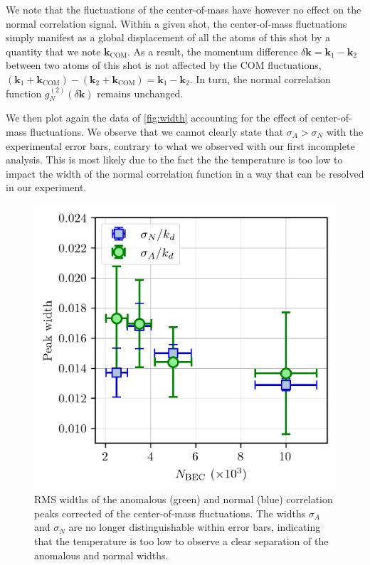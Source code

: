 We note that the fluctuations of the center-of-mass have however no effect on the normal correlation signal. Within a given shot, the center-of-mass fluctuations simply manifest as a global displacement of all the atoms of this shot by a quantity that we note $\bm{k}_{\mathrm{COM}}$. As a result, the momentum difference $\delta \bm{k} = \bm{k}_1 - \bm{k}_2$ between two atoms of this shot is not affected by the COM fluctuations, $(\bm{k}_1+\bm{k}_{\mathrm{COM}}) - (\bm{k}_2+\bm{k}_{\mathrm{COM}})=\bm{k}_1 - \bm{k}_2$. In turn, the normal correlation function $g^{(2)}_{N}(\delta \bm{k})$ remains unchanged.

We then plot again the data of \ref{fig:width} accounting for the effect of center-of-mass fluctuations. We observe that we cannot clearly state that $\sigma_A > \sigma_N$ with the experimental error bars, contrary to what we observed with our first incomplete analysis. This is most likely due to the fact the the temperature is too low to impact the width of the normal correlation function in a way that can be resolved in our experiment. 


\begin{figure}
    \centering
    \includegraphics{Fig/Chapter4/widths_corrected.png}
    \caption[Corrected RMS widths of the anomalous and normal correlation peaks]{RMS widths of the anomalous (green) and normal (blue) correlation peaks corrected of the center-of-mass fluctuations. The widths $\sigma_A$ and $\sigma_N$ are no longer distinguishable within error bars, indicating that the temperature is too low to observe a clear separation of the anomalous and normal widths.}
    \label{fig:my_label}
\end{figure}


